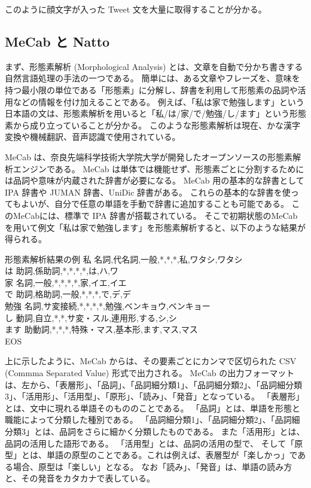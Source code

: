 \documentclass[11pt,a4j]{jsarticle}
\begin{document}
このように顔文字が入った Tweet 文を大量に取得することが分かる。

\subsection{MeCab と Natto}
まず、形態素解析 (Morphological Analysis) とは、文章を自動で分かち書きする自然言語処理の手法の一つである。
簡単には、ある文章やフレーズを、意味を持つ最小限の単位である「形態素」に分解し、辞書を利用して形態素の品詞や活用などの情報を付け加えることである。
例えば、「私は家で勉強します」という日本語の文は、形態素解析を用いると「私/は/家/で/勉強/し/ます」という形態素から成り立っていることが分かる。
このような形態素解析は現在、かな漢字変換や機械翻訳、音声認識で使用されている。

MeCab  は、奈良先端科学技術大学院大学が開発したオープンソースの形態素解析エンジンである。
MeCab は単体では機能せず、形態素ごとに分割するためには品詞や意味が内蔵された辞書が必要になる。
MeCab 用の基本的な辞書として IPA 辞書や JUMAN 辞書、UniDic 辞書がある。
これらの基本的な辞書を使ってもよいが、自分で任意の単語を手動で辞書に追加することも可能である。
このMeCabには、標準で IPA 辞書が搭載されている。
そこで初期状態のMeCab を用いて例文「私は家で勉強します」を形態素解析すると、以下のような結果が得られる。

\begin{itembox}[l]{形態素解析結果の例}
私  名詞,代名詞,一般,*,*,*,私,ワタシ,ワタシ\\
は  助詞,係助詞,*,*,*,*,は,ハ,ワ\\
家  名詞,一般,*,*,*,*,家,イエ,イエ\\
で  助詞,格助詞,一般,*,*,*,で,デ,デ\\
勉強  名詞,サ変接続,*,*,*,*,勉強,ベンキョウ,ベンキョー\\
し  動詞,自立,*,*,サ変・スル,連用形,する,シ,シ\\
ます  助動詞,*,*,*,特殊・マス,基本形,ます,マス,マス\\
EOS
\end{itembox}

上に示したように、MeCab からは、その要素ごとにカンマで区切られた CSV (Commma Separated Value) 形式で出力される。
MeCab の出力フォーマットは、左から、「表層形」、「品詞」、「品詞細分類1」、「品詞細分類2」、「品詞細分類3」、「活用形」、「活用型」、「原形」、「読み」、「発音」となっている。
「表層形」とは、文中に現れる単語そのもののことである。
「品詞」とは、単語を形態と職能によって分類した種別である。
「品詞細分類1」、「品詞細分類2」、「品詞細分類3」とは、品詞をさらに細かく分類したものである。
また「活用形」とは、品詞の活用した語形である。
「活用型」とは、品詞の活用の型で、
そして「原型」とは、単語の原型のことである。これは例えば、表層型が「楽しかっ」である場合、原型は「楽しい」となる。
なお「読み」、「発音」は、単語の読み方と、その発音をカタカナで表している。
\end{document}
